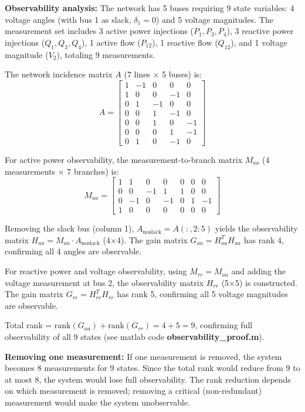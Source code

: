\documentclass{article}
\begin{document}
\textbf{Observability analysis:} The network has 5 buses requiring 9 state variables: 4 voltage angles (with bus 1 as slack, $\delta_1 = 0$) and 5 voltage magnitudes. The measurement set includes 3 active power injections ($P_1, P_3, P_4$), 3 reactive power injections ($Q_1, Q_3, Q_4$), 1 active flow ($P_{12}$), 1 reactive flow ($Q_{12}$), and 1 voltage magnitude ($V_2$), totaling 9 measurements.

The network incidence matrix $A$ (7 lines × 5 buses) is:
\[
A = \begin{bmatrix}
1 & -1 & 0 & 0 & 0 \\
1 & 0 & 0 & -1 & 0 \\
0 & 1 & -1 & 0 & 0 \\
0 & 0 & 1 & -1 & 0 \\
0 & 0 & 1 & 0 & -1 \\
0 & 0 & 0 & 1 & -1 \\
0 & 1 & 0 & -1 & 0
\end{bmatrix}
\]

For active power observability, the measurement-to-branch matrix $M_{aa}$ (4 measurements × 7 branches) is:
\[
M_{aa} = \begin{bmatrix}
1 & 1 & 0 & 0 & 0 & 0 & 0 \\
0 & 0 & -1 & 1 & 1 & 0 & 0 \\
0 & -1 & 0 & -1 & 0 & 1 & -1 \\
1 & 0 & 0 & 0 & 0 & 0 & 0
\end{bmatrix}
\]

Removing the slack bus (column 1), $A_{\text{noslack}} = A(:, 2:5)$ yields the observability matrix $H_{aa} = M_{aa} \cdot A_{\text{noslack}}$ (4×4). The gain matrix $G_{aa} = H_{aa}^T H_{aa}$ has rank 4, confirming all 4 angles are observable.

For reactive power and voltage observability, using $M_{rr} = M_{aa}$ and adding the voltage measurement at bus 2, the observability matrix $H_{rr}$ (5×5) is constructed. The gain matrix $G_{rr} = H_{rr}^T H_{rr}$ has rank 5, confirming all 5 voltage magnitudes are observable.

Total rank = $\text{rank}(G_{aa}) + \text{rank}(G_{rr}) = 4 + 5 = 9$, confirming full observability of all 9 states (see matlab code \textbf{observability\_proof.m}).

\textbf{Removing one measurement:} If one measurement is removed, the system becomes 8 measurements for 9 states. Since the total rank would reduce from 9 to at most 8, the system would lose full observability. The rank reduction depends on which measurement is removed; removing a critical (non-redundant) measurement would make the system unobservable.
\end{document}
